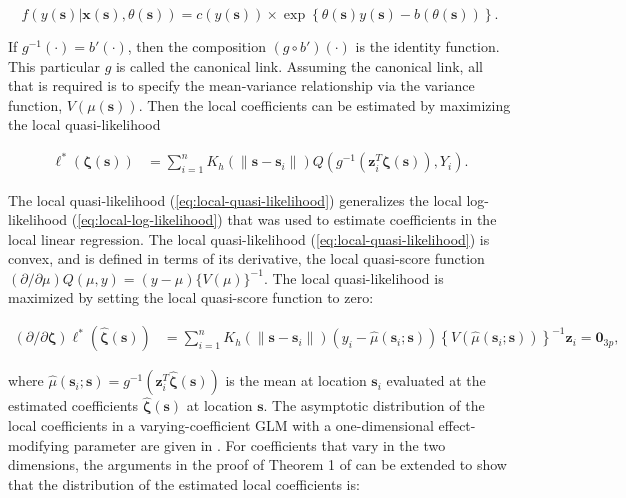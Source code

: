 \documentclass[authoryear,review, 12pt]{elsarticle}
\begin{document}
\[
f\left(y(\bm{s})|\bm{x}(\bm{s}),\theta(\bm{s})\right)=c\left(y(\bm{s})\right)\times\exp\left\{ \theta(\bm{s})y(\bm{s})-b\left(\theta(\bm{s})\right)\right\} .
\]


If $g^{-1}(\cdot)=b'(\cdot)$, then the composition $(g\circ b')(\cdot)$
is the identity function. This particular $g$ is called the canonical
link. Assuming the canonical link, all that is required is to specify
the mean-variance relationship via the variance function, $V\left(\mu(\bm{s})\right)$.
Then the local coefficients can be estimated by maximizing the local
quasi-likelihood 

\begin{align}
\mathcal{\ell}^{*}\left(\bm{\zeta}(\bm{s})\right) & =\sum_{i=1}^{n}K_{h}\left(\|\bm{s}-\bm{s}_{i}\|\right)Q\left(g^{-1}\left(\bm{z}_{i}^{T}\bm{\zeta}(\bm{s})\right),Y_{i}\right).\label{eq:local-quasi-likelihood}
\end{align}


The local quasi-likelihood (\ref{eq:local-quasi-likelihood}) generalizes
the local log-likelihood (\ref{eq:local-log-likelihood}) that was
used to estimate coefficients in the local linear regression. The
local quasi-likelihood (\ref{eq:local-quasi-likelihood}) is convex,
and is defined in terms of its derivative, the local quasi-score function
$\left(\partial/\partial\mu\right)Q(\mu,y)=(y-\mu)\{V(\mu)\}^{-1}$.
The local quasi-likelihood is maximized by setting the local quasi-score
function to zero:

\begin{align}
(\partial/\partial\bm{\zeta})\mathcal{\ell}^{*}\left(\hat{\bm{\zeta}}(\bm{s})\right) & =\sum_{i=1}^{n}K_{h}\left(\|\bm{s}-\bm{s}_{i}\|\right)\left(y_{i}-\hat{\mu}(\bm{s}_{i};\bm{s})\right)\left\{ V\left(\hat{\mu}(\bm{s}_{i};\bm{s})\right)\right\} ^{-1}\bm{z}_{i}=\bm{0}_{3p},
\end{align}


where $\hat{\mu}(\bm{s}_{i};\bm{s})=g^{-1}\left(\bm{z}_{i}^{T}\hat{\bm{\zeta}}(\bm{s})\right)$
is the mean at location $\bm{s}_{i}$ evaluated at the estimated coefficients
$\hat{\bm{\zeta}}(\bm{s})$ at location $\bm{s}$. The asymptotic
distribution of the local coefficients in a varying-coefficient GLM
with a one-dimensional effect-modifying parameter are given in \citet{Cai-Fan-Li-2000}.
For coefficients that vary in the two dimensions, the arguments in
the proof of Theorem 1 of \citet{Cai-Fan-Li-2000} can be extended
to show that the distribution of the estimated local coefficients
is:
\end{document}
